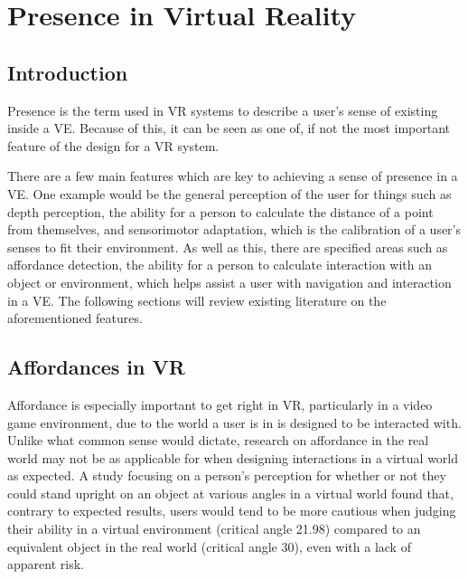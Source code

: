 \section{Presence in Virtual Reality}
\label{lr:vr}

\begin{multicols*}{2}
	
	\subsection{Introduction}
	\label{lr:vr:intro}
		Presence is the term used in VR systems to describe a user's sense of existing inside a VE. Because of this, it can be seen as one of, if not the most important feature of the design for a VR system.

		There are a few main features which are key to achieving a sense of presence in a VE. One example would be the general perception of the user for things such as depth perception, the ability for a person to calculate the distance of a point from themselves, and sensorimotor adaptation, which is the calibration of a user's senses to fit their environment.
		As well as this, there are specified areas such as affordance detection, the ability for a person to calculate interaction with an object or environment, which helps assist a user with navigation and interaction in a VE.
		The following sections will review existing literature on the aforementioned features.
	
	\subsection{Affordances in VR}
	\label{lr:vr:affordances}
		Affordance is especially important to get right in VR, particularly in a video game environment, due to the world a user is in is designed to be interacted with.
		Unlike what common sense would dictate, research on affordance in the real world may not be as applicable for when designing interactions in a virtual world as expected.
		A study \cite{Regia-Corte2012} focusing on a person's perception for whether or not they could stand upright on an object at various angles in a virtual world found that, contrary to expected results, users would tend to be more cautious when judging their ability in a virtual environment (critical angle 21.98\degree) compared to an equivalent object in the real world (critical angle 30\degree), even with a lack of apparent risk.


\end{multicols*}
